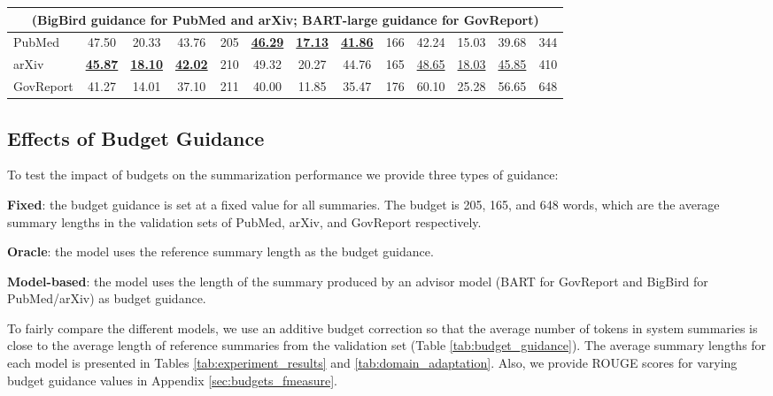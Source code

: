 \documentclass[11pt,table]{article}
\newenvironment{itemizesquish}[2]{\begin{list}{\labelitemi}{\setlength{\itemsep}{#1}\setlength{\labelwidth}{#2}\setlength{\leftmargin}{\labelwidth}\addtolength{\leftmargin}{\labelsep}}}{\end{list}}
\begin{document}
\begin{table*}
\begin{tabular}{l|cccc|cccc|cccc}
    \multicolumn{13}{c}{(BigBird guidance for PubMed and arXiv; BART-large guidance for GovReport)} \\
    \midrule
    PubMed & \cellcolor{blue!10}47.50 & \cellcolor{blue!10}20.33 & \cellcolor{blue!10}43.76 & \cellcolor{blue!10}205 & \underline{\textbf{46.29}} & \underline{\textbf{17.13}} & \underline{\textbf{41.86}} & 166 & 42.24 & 15.03 & 39.68 & 344 \\
    arXiv & \underline{\textbf{45.87}} & \underline{\textbf{18.10}} & \underline{\textbf{42.02}} & 210 & \cellcolor{blue!10}49.32 & \cellcolor{blue!10}20.27 & \cellcolor{blue!10}44.76 & \cellcolor{blue!10}165 & \underline{48.65} & \underline{18.03} & \underline{45.85} & 410 \\
    GovReport & 41.27 & 14.01 & 37.10 & 211 & 40.00 & 11.85 & 35.47 & 176 & \cellcolor{blue!10}60.10 & \cellcolor{blue!10}25.28 & \cellcolor{blue!10}56.65 & \cellcolor{blue!10}648 \\
    \bottomrule
  \end{tabular}
  \caption{ROUGE F1 scores and average words per summary for the domain adaptation experiments. Models trained on PubMed, arXiv, and GovReport samples (rows) are used to summarize articles from the other dataset test splits (columns). The choice of budget guidance values is described in Appendix \ref{sec:inference_details}. \colorbox{blue!10}{Shaded scores} are in-domain results from Table \ref{tab:experiment_results}. \underline{Underlined results} are statistically equivalent to the best cross-domain scores ().}\label{tab:domain_adaptation}
\end{table*}

\subsection{Effects of Budget Guidance}
\label{sec:results-budget-guidance}
To test the impact of budgets on the summarization performance we provide three types of guidance: 
\begin{itemizesquish}{-0.3em}{0.5em}
    \item \textbf{Fixed}: the budget guidance is set at a fixed value for all summaries. The budget is 205, 165, and 648 words, which are the average summary lengths in the validation sets of PubMed, arXiv, and GovReport respectively.
    \item \textbf{Oracle}: the model uses the reference summary length as the budget guidance.
    \item \textbf{Model-based}: the model uses the length of the summary produced by an advisor model (BART for GovReport and BigBird for PubMed/arXiv) as budget guidance.
\end{itemizesquish}
To fairly compare the different models, we use an additive budget correction so that the average number of tokens in system summaries is close to the average length of reference summaries from the validation set (Table \ref{tab:budget_guidance}). The average summary lengths for each model is presented in Tables \ref{tab:experiment_results} and \ref{tab:domain_adaptation}. Also, we provide ROUGE scores for varying budget guidance values in Appendix \ref{sec:budgets_fmeasure}.
\end{document}
